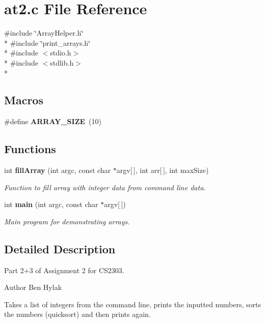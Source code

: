 \section{at2.\+c File Reference}
\label{at2_8c}
{\ttfamily \#include \char`\"{}Array\+Helper.\+h\char`\"{}}\\*
{\ttfamily \#include \char`\"{}print\+\_\+arrays.\+h\char`\"{}}\\*
{\ttfamily \#include $<$stdio.\+h$>$}\\*
{\ttfamily \#include $<$stdlib.\+h$>$}\\*
\subsection*{Macros}
\begin{DoxyCompactItemize}
\item 
\#define {\bf A\+R\+R\+A\+Y\+\_\+\+S\+I\+ZE}~(10)
\end{DoxyCompactItemize}
\subsection*{Functions}
\begin{DoxyCompactItemize}
\item 
int {\bf fill\+Array} (int argc, const char $\ast$argv[$\,$], int arr[$\,$], int max\+Size)
\begin{DoxyCompactList}\small\item\em Function to fill array with integer data from command line data. \end{DoxyCompactList}\item 
int {\bf main} (int argc, const char $\ast$argv[$\,$])
\begin{DoxyCompactList}\small\item\em Main program for demonstrating arrays. \end{DoxyCompactList}\end{DoxyCompactItemize}


\subsection{Detailed Description}
Part 2+3 of Assignment 2 for C\+S2303.

\begin{DoxyAuthor}{Author}
Ben Hylak
\end{DoxyAuthor}
Takes a list of integers from the command line, prints the inputted numbers, sorts the numbers (quicksort) and then prints again. 

